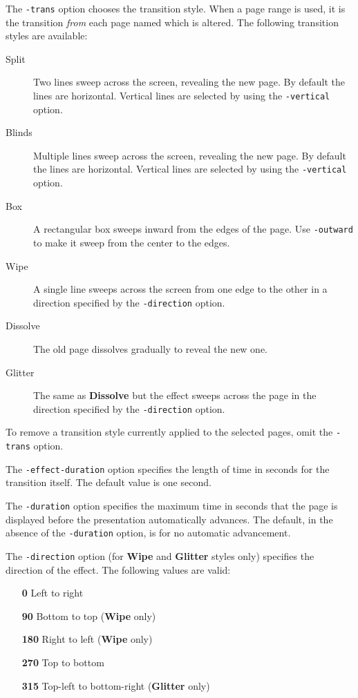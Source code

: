 \documentclass{book}
\begin{document}
The \texttt{-trans} option chooses the transition style. When a page range is
used, it is the transition \textit{from} each page named which is altered. The
following transition styles are available:

\begin{description}
  \item[Split]Two lines sweep across the screen, revealing the new page. By
default the lines are horizontal. Vertical lines are selected by using the
\texttt{-vertical} option.
  \item[Blinds]Multiple lines sweep across the screen, revealing the new page.
By default the lines are horizontal. Vertical lines are selected by using the
\texttt{-vertical} option.
  \item[Box]A rectangular box sweeps inward from the edges of the page. Use
\texttt{-outward} to make it sweep from the center to the edges.
  \item[Wipe]A single line sweeps across the screen from one edge to the other
in a direction specified by the \texttt{-direction} option.
  \item[Dissolve]The old page dissolves gradually to reveal the new one.
  \item[Glitter]The same as \textbf{Dissolve} but the effect sweeps across the
page in the direction specified by the \texttt{-direction} option.
\end{description}

\noindent To remove a transition style currently applied to the selected pages,
omit the \texttt{-trans} option.

The \texttt{-effect-duration} option specifies the length of time in seconds
for the transition itself. The default value is one second.

The \texttt{-duration} option specifies the maximum time in seconds that the
page is displayed before the presentation automatically advances. The default,
in the absence of the \texttt{-duration} option, is for no automatic
advancement.

The \texttt{-direction} option (for \textbf{Wipe} and \textbf{Glitter} styles
only) specifies the direction of the effect. The following values are valid:
\begin{itemize}
  \item[\textbf{0}] Left to right
  \item[\textbf{90}] Bottom to top (\textbf{Wipe} only)
  \item[\textbf{180}] Right to left (\textbf{Wipe} only)
  \item[\textbf{270}] Top to bottom
  \item[\textbf{315}] Top-left to bottom-right (\textbf{Glitter} only)
\end{itemize}
\end{document}
